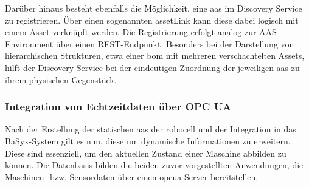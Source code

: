 

Darüber hinaus besteht ebenfalls die Möglichkeit, eine \acs{aas} im Discovery Service zu registrieren.
Über einen sogenannten assetLink kann diese dabei logisch mit einem Asset verknüpft werden.
Die Registrierung erfolgt analog zur AAS Environment über einen REST-Endpunkt.
Besonders bei der Darstellung von hierarchischen Strukturen, etwa einer \acs{bom} mit mehreren verschachtelten Assets, hilft der Discovery Service bei der eindeutigen Zuordnung der jeweiligen \acs{aas} zu ihrem physischen Gegenstück.

\subsubsection{Integration von Echtzeitdaten über OPC UA}
Nach der Erstellung der statischen \acs{aas} der robocell und der Integration in das BaSyx-System gilt es nun, diese um dynamische Informationen zu erweitern.
Diese sind essenziell, um den aktuellen Zustand einer Maschine abbilden zu können.
Die Datenbasis bilden die beiden zuvor vorgestellten Anwendungen, die Maschinen- bzw. Sensordaten über einen \acs{opcua} Server bereitstellen.




